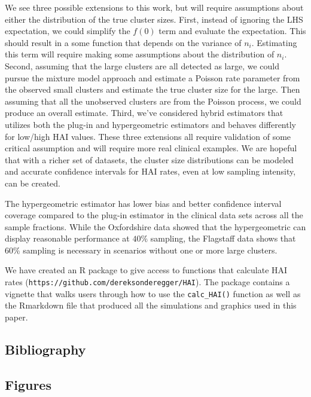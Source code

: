 \documentclass[]{article}
\begin{document}
We see three possible extensions to this work, but will require
assumptions about either the distribution of the true cluster sizes.
First, instead of ignoring the LHS expectation, we could simplify the
\(f(0)\) term and evaluate the expectation. This should result in a some
function that depends on the variance of \(n_i\). Estimating this term
will require making some assumptions about the distribution of \(n_i\).
Second, assuming that the large clusters are all detected as large, we
could pursue the mixture model approach and estimate a Poisson rate
parameter from the observed small clusters and estimate the true cluster
size for the large. Then assuming that all the unobserved clusters are
from the Poisson process, we could produce an overall estimate. Third,
we've considered hybrid estimators that utilizes both the plug-in and
hypergeometric estimators and behaves differently for low/high HAI
values. These three extensions all require validation of some critical
assumption and will require more real clinical examples. We are hopeful
that with a richer set of datasets, the cluster size distributions can
be modeled and accurate confidence intervals for HAI rates, even at low
sampling intensity, can be created.

The hypergeometric estimator has lower bias and better confidence
interval coverage compared to the plug-in estimator in the clinical data
sets across all the sample fractions. While the Oxfordshire data showed
that the hypergeometric can display reasonable performance at \(40\%\)
sampling, the Flagstaff data shows that \(60\%\) sampling is necessary
in scenarios without one or more large clusters.

We have created an R package to give access to functions that calculate
HAI rates (\texttt{https://github.com/dereksonderegger/HAI}). The
package contains a vignette that walks users through how to use the
\texttt{calc\_HAI()} function as well as the Rmarkdown file that
produced all the simulations and graphics used in this paper.

\hypertarget{bibliography}{%
\subsection{Bibliography}\label{bibliography}}

\hypertarget{figures}{%
\subsection{Figures}\label{figures}}
\end{document}
